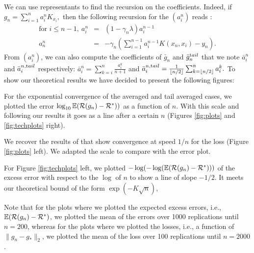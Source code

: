 We can use representants to find the recursion on the coefficients. Indeed, if  $g_n = \sum_{i = 1}^n a^n_i K_{x_i},$ then the following recursion for the $(a_i^n)$ reads : 
\begin{eqnarray*}
\text{for } i \leqslant n-1, \ a_i^n &=& (1-\gamma_n \lambda) a_i^{n-1} \\
a_n^n &=& -\gamma_n (\sum_{i = 1}^{n-1} a_i^{n-1} K(x_n,x_i)-y_n).
\end{eqnarray*}
%
From $(a_i^n)$, we can also compute the coefficients of $\bar{g}_n$ and $\bar{g}_n^{\textrm tail}$ that we note $\bar{a}^n_i$ and $\bar{a}^{n,\textrm tail}_i$ respectively: $\bar{a}^n_i = \sum_{k = i}^n \frac{a_i^k}{n+1}$ and $\bar{a}^{n,\textrm tail}_i = \frac{1}{\lfloor n/2 \rfloor}\sum_{k = \lfloor n/2 \rfloor }^n a_i^k.$
%
To show our theoretical results we have decided to present the following figures: 

\BIT
\item For the exponential convergence of the averaged and tail averaged cases, we plotted the error $\log_{10}\mathbb{E}({\cal R}(g_n)-{\cal R}^*))$ as a function of $n$. With this scale and following our results it goes as a line after a certain $n$ (Figures \ref{fig:plots} and \ref{fig:techplots} right).
\item We recover the results of \citet{daft} that show convergence at speed $1/n$ for the loss (Figure \ref{fig:plots} left). We adapted the scale to compare with the error plot.
\item For Figure \ref{fig:techplots} left, we plotted $-\log (- \log (\mathbb{E}({\cal R}(g_n)-{\cal R}^*)) ) $ of the excess error with respect to the $\log$ of $n$ to show a line of slope $-1/2$. It meets our theoretical bound of the form $\exp(-K\sqrt{n})$, 
\EIT

Note that for the plots where we plotted the expected excess errors, i.e., $\mathbb{E}({\cal R}(g_n)-{\cal R}^*)$, we plotted the mean of the errors over 1000 replications until $n = 200$, whereas for the plots where we plotted the losses, i.e., a function of $\|g_n- g_*\|_2$, we plotted the mean of the loss over 100 replications until $n = 2000$.

